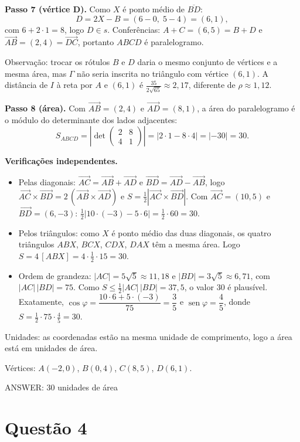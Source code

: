 \documentclass{article}%
\begin{document}
\textbf{Passo 7 (vértice D).} Como $X$ é ponto médio de $\overline{BD}$:
\[
D=2X-B=(6-0,\;5-4)=(6,1),
\]
com $6+2\cdot1=8$, logo $D\in s$. Conferências: $A+C=(6,5)=B+D$ e $\overrightarrow{AB}=(2,4)=\overrightarrow{DC}$, portanto $ABCD$ é paralelogramo.

Observação: trocar os rótulos $B$ e $D$ daria o mesmo conjunto de vértices e a mesma área, mas $\Gamma$ não seria inscrita no triângulo com vértice $(6,1)$. A distância de $I$ à reta por $A$ e $(6,1)$ é $\tfrac{35}{2\sqrt{65}}\approx 2{,}17$, diferente de $\rho\approx 1{,}12$.

\textbf{Passo 8 (área).} Com $\overrightarrow{AB}=(2,4)$ e $\overrightarrow{AD}=(8,1)$, a área do paralelogramo é o módulo do determinante dos lados adjacentes:
\[
S_{ABCD}=\left|\det\begin{pmatrix}2&8\\4&1\end{pmatrix}\right|=|2\cdot1-8\cdot4|=|-30|=30.
\]

\textbf{Verificações independentes.}
\begin{itemize}
\item Pelas diagonais: $\overrightarrow{AC}=\overrightarrow{AB}+\overrightarrow{AD}$ e $\overrightarrow{BD}=\overrightarrow{AD}-\overrightarrow{AB}$, logo $\overrightarrow{AC}\times\overrightarrow{BD}=2\,(\overrightarrow{AB}\times\overrightarrow{AD})$ e $S=\tfrac12\left|\overrightarrow{AC}\times\overrightarrow{BD}\right|$. Com $\overrightarrow{AC}=(10,5)$ e $\overrightarrow{BD}=(6,-3)$: $\tfrac12\left|10\cdot(-3)-5\cdot6\right|=\tfrac12\cdot60=30$.
\item Pelos triângulos: como $X$ é ponto médio das duas diagonais, os quatro triângulos $ABX$, $BCX$, $CDX$, $DAX$ têm a mesma área. Logo $S=4\,[ABX]=4\cdot\tfrac12\cdot15=30$.
\item Ordem de grandeza: $|AC|=5\sqrt5\approx11{,}18$ e $|BD|=3\sqrt5\approx6{,}71$, com $|AC|\,|BD|=75$. Como $S\le\tfrac12|AC|\,|BD|=37{,}5$, o valor 30 é plausível. Exatamente, $\cos\varphi=\dfrac{10\cdot6+5\cdot(-3)}{75}=\dfrac35$ e $\operatorname{sen}\varphi=\dfrac45$, donde $S=\tfrac12\cdot75\cdot\tfrac45=30$.
\end{itemize}

Unidades: as coordenadas estão na mesma unidade de comprimento, logo a área está em unidades de área.

Vértices: $A(-2,0)$, $B(0,4)$, $C(8,5)$, $D(6,1)$.

ANSWER: 30 unidades de área%
\newpage%
\section*{Questão 4}
\end{document}
